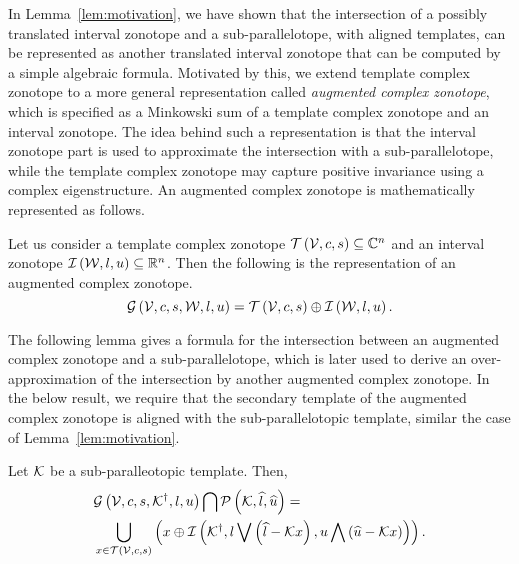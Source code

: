 In Lemma~\ref{lem:motivation}, we have shown that the intersection of
a possibly translated interval zonotope and a sub-parallelotope, with
aligned templates, can be represented as another translated interval
zonotope that can be computed by a simple algebraic formula.
Motivated by this, we extend template complex zonotope to a more
general representation called {\it augmented complex zonotope},
which is specified as a Minkowski sum of a template complex zonotope
and an interval zonotope.  The idea behind such a representation is
that the interval zonotope part is used to approximate the
intersection with a sub-parallelotope, while the template complex
zonotope may capture positive invariance using a complex
eigenstructure.  An augmented complex zonotope is
mathematically represented as follows.
%
\begin{definition}
Let us consider a template complex zonotope
$\mathit{\operatorname{\mathcal{T}}}\left(\mathcal{V},c,s\right)\subseteq\mathbb{C}^n$ and an interval
zonotope $\mathit{\operatorname{\mathcal{I}}}\left(\mathcal{W},l,u\right)\subseteq\mathbb{R}^n$.  Then the
following is the representation of an augmented complex zonotope.
%
\[
\mathcal{G}\left(\mathcal{V},c,s,\mathcal{W},l,u\right)=\mathit{\operatorname{\mathcal{T}}}\left(\mathcal{V},c,s\right)\oplus \mathit{\operatorname{\mathcal{I}}}\left(\mathcal{W},l,u\right).
\]
%
\end{definition}
%
The following lemma gives a formula for the intersection between
an augmented complex zonotope and a sub-parallelotope, which is later
used to derive an over-approximation of the intersection by another
augmented complex zonotope.  In the below result, we require that the
secondary template of the augmented complex zonotope is aligned with
the sub-parallelotopic template, similar the case of Lemma~\ref{lem:motivation}.
%
\begin{lemma}
Let $\mathcal{K}$ be a sub-paralleotopic template.  Then,
%
\begin{align*}
&
\mathcal{G}\left(\mathcal{V},c,s,{\mathcal{K}}^\dagger,l,u\right)\bigcap\mathcal{P}\left(\mathcal{K},\widehat{l},\widehat{u}\right)=\\
&
\bigcup_{x\in\mathit{\operatorname{\mathcal{T}}}\left(\mathcal{V},c,s\right)}\left(x\oplus\mathit{\operatorname{\mathcal{I}}}\left({\mathcal{K}}^\dagger,l\bigvee \left(\widehat{l}-\mathcal{K}
  x\right),u\bigwedge \left(\widehat{u}-\mathcal{K} x\right)\right)\right).
\end{align*}
%
\end{lemma}
%
